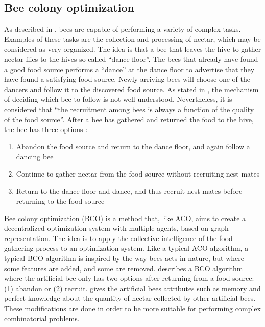 \subsection{Bee colony optimization}
\label{subsec:BCO}
As described in \citet{lucic03}, bees are capable of performing a variety of complex tasks. Examples of these tasks are the collection and processing of nectar, which may be considered as very organized. The idea is that a bee that leaves the hive to gather nectar flies to the hives so-called ``dance floor''. The bees that already have found a good food source performs a ``dance'' at the dance floor to advertise that they have found a satisfying food source. Newly arriving bees will choose one of the dancers and follow it to the discovered food source. As stated in \citet{lucic03}, the mechanism of deciding which bee to follow is not well understood.  Nevertheless, it is considered that ``the recruitment among bees is always a function of the quality of the food source''. After a bee has gathered and returned the food to the hive, the bee has three options \citep{lucic03}:

\begin{enumerate}
  \item Abandon the food source and return to the dance floor, and again follow a dancing bee
  \item Continue to gather nectar from the food source without recruiting nest mates
  \item Return to the dance floor and dance, and thus recruit nest mates before returning to the food source
\end{enumerate}

Bee colony optimization (BCO) is a method that, like ACO, aims to create a decentralized optimization system with multiple agents, based on graph representation. The idea is to apply the collective intelligence of the food gathering process to an optimization system. Like a typical ACO algorithm, a typical BCO algorithm is inspired by the way bees acts in nature, but where some features are added, and some are removed. \citet{nikolic14} describes a BCO algorithm where the artificial bee only has two options after returning from a food source: (1) abandon or (2) recruit. \citet{lucic03} gives the artificial bees attributes such as memory and perfect knowledge about the quantity of nectar collected by other artificial bees. These modifications are done in order to be more suitable for performing complex combinatorial problems.

